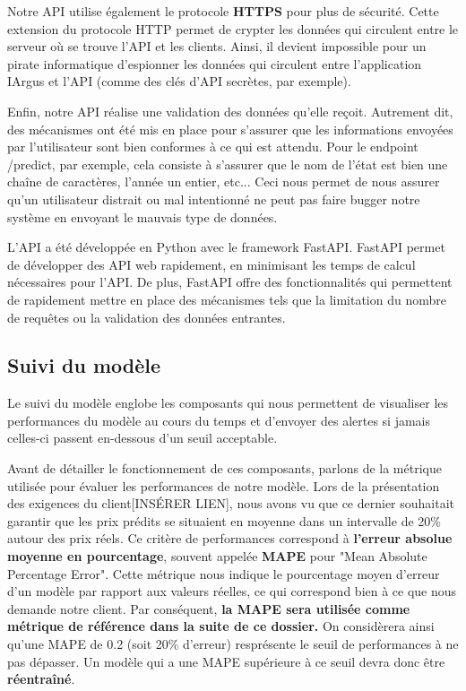 \documentclass[french]{article}
\begin{document}
    Notre API utilise également le protocole \textbf{HTTPS} pour plus de sécurité. Cette extension du protocole HTTP permet de crypter les données qui circulent entre le serveur où se trouve l'API et les clients. Ainsi, il devient impossible pour un pirate informatique d'espionner les données qui circulent entre l'application IArgus et l'API (comme des clés d'API secrètes, par exemple).

    Enfin, notre API réalise une validation des données qu'elle reçoit. Autrement dit, des mécanismes ont été mis en place pour s'assurer que les informations envoyées par l'utilisateur sont bien conformes à ce qui est attendu. Pour le endpoint /predict, par exemple, cela consiste à s'assurer que le nom de l'état est bien une chaîne de caractères, l'année un entier, etc... Ceci nous permet de nous assurer qu'un utilisateur distrait ou mal intentionné ne peut pas faire bugger notre système en envoyant le mauvais type de données.

    L'API a été développée en Python avec le framework FastAPI. FastAPI permet de développer des API web rapidement, en minimisant les temps de calcul nécessaires pour l'API. De plus, FastAPI offre des fonctionnalités qui permettent de rapidement mettre en place des mécanismes tels que la limitation du nombre de requêtes ou la validation des données entrantes.

    \subsection{Suivi du modèle}

    Le suivi du modèle englobe les composants qui nous permettent de visualiser les performances du modèle au cours du temps et d'envoyer des alertes si jamais celles-ci passent en-dessous d'un seuil acceptable. 
    
    Avant de détailler le fonctionnement de ces composants, parlons de la métrique utilisée pour évaluer les performances de notre modèle. Lors de la présentation des exigences du client[INSÉRER LIEN], nous avons vu que ce dernier souhaitait garantir que les prix prédits se situaient en moyenne dans un intervalle de 20\% autour des prix réels. Ce critère de performances correspond à \textbf{l'erreur absolue moyenne en pourcentage}, souvent appelée \textbf{MAPE} pour "Mean Absolute Percentage Error". Cette métrique nous indique le pourcentage moyen d'erreur d'un modèle par rapport aux valeurs réelles, ce qui correspond bien à ce que nous demande notre client. Par conséquent, \textbf{la MAPE sera utilisée comme métrique de référence dans la suite de ce dossier.} On considèrera ainsi qu'une MAPE de 0.2 (soit 20\% d'erreur) resprésente le seuil de performances à ne pas dépasser. Un modèle qui a une MAPE supérieure à ce seuil devra donc être \textbf{réentraîné}.
\end{document}
